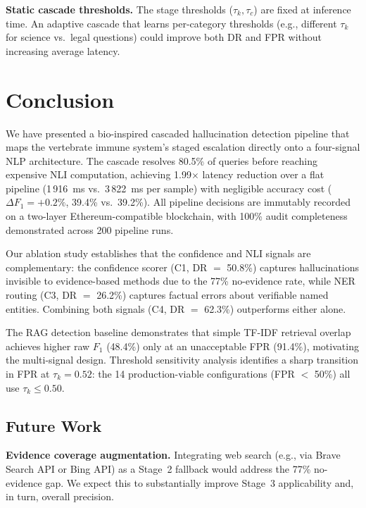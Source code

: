 \documentclass[11pt,a4paper]{article}
\newcommand{\fone}{F_1}
\newcommand{\tauK}{\tau_k}
\newcommand{\tauC}{\tau_c}
\begin{document}
\textbf{Static cascade thresholds.}
The stage thresholds ($\tauK, \tauC$) are fixed at inference time. An adaptive
cascade that learns per-category thresholds (e.g., different $\tauK$ for
science vs.\ legal questions) could improve both DR and FPR without increasing
average latency.

\section{Conclusion}
\label{sec:conclusion}

We have presented a bio-inspired cascaded hallucination detection pipeline that
maps the vertebrate immune system's staged escalation directly onto a four-signal
NLP architecture. The cascade resolves 80.5\% of queries before reaching
expensive NLI computation, achieving 1.99$\times$ latency reduction over a flat
pipeline (1\,916~ms vs.\ 3\,822~ms per sample) with negligible accuracy cost
($\Delta\fone = +0.2\%$, 39.4\% vs.\ 39.2\%). All pipeline decisions are
immutably recorded on a two-layer Ethereum-compatible blockchain, with 100\%
audit completeness demonstrated across 200 pipeline runs.

Our ablation study establishes that the confidence and NLI signals are
complementary: the confidence scorer (C1, DR $=$ 50.8\%) captures hallucinations
invisible to evidence-based methods due to the 77\% no-evidence rate, while NER
routing (C3, DR $=$ 26.2\%) captures factual errors about verifiable named
entities. Combining both signals (C4, DR $=$ 62.3\%) outperforms either alone.

The RAG detection baseline demonstrates that simple TF-IDF retrieval overlap
achieves higher raw $\fone$ (48.4\%) only at an unacceptable FPR (91.4\%),
motivating the multi-signal design. Threshold sensitivity analysis identifies a
sharp transition in FPR at $\tauK = 0.52$: the 14 production-viable
configurations (FPR $<$ 50\%) all use $\tauK \leq 0.50$.

\subsection{Future Work}

\textbf{Evidence coverage augmentation.} Integrating web search (e.g., via
Brave Search API or Bing API) as a Stage~2 fallback would address the 77\%
no-evidence gap. We expect this to substantially improve Stage~3 applicability
and, in turn, overall precision.
\end{document}
